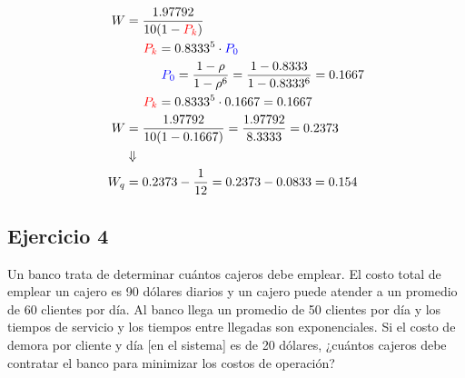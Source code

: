 \documentclass{templateNote}
\begin{document}
\begin{mdframed}
\begin{align*}
    W &= \frac{1.97792}{10(1-\textcolor{red}{P_k})}\\
        &\hspace{5mm} \textcolor{red}{P_k} = 0.8333^5 \cdot \textcolor{blue}{P_0}\\
        &\hspace{10mm} \textcolor{blue}{P_0} = \frac{1-\rho}{1-\rho^6} = \frac{1-0.8333}{1-0.8333^6} = 0.1667\\
        &\hspace{5mm} \textcolor{red}{P_k} = 0.8333^5 \cdot 0.1667 = 0.1667\\
    W &= \frac{1.97792}{10(1-0.1667)} = \frac{1.97792}{8.3333} = 0.2373 \\
    &\Downarrow \\
    W_q &= 0.2373 - \frac{1}{12} = 0.2373 - 0.0833 = 0.154
\end{align*}
\end{mdframed}


\newpage
\subsection{Ejercicio 4}
\noindent Un banco trata de determinar cuántos cajeros debe emplear. El costo total de emplear un cajero es 90 dólares diarios y un cajero puede atender a un promedio de 60 clientes por día. Al banco llega un promedio de 50 clientes por día y los tiempos de servicio y los tiempos entre llegadas son exponenciales. Si el costo de demora por cliente y día [en el sistema] es de 20 dólares, ¿cuántos cajeros debe contratar el banco para minimizar los costos de operación?
\end{document}
